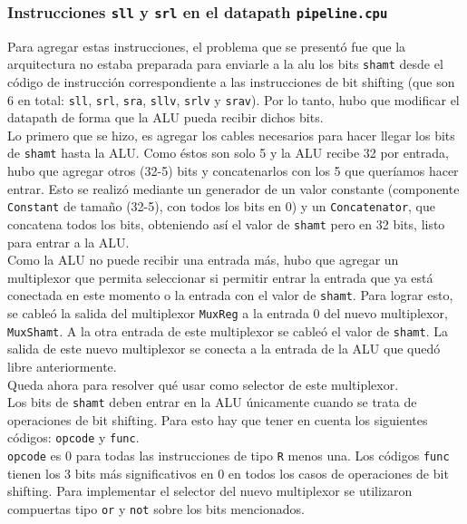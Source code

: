 \documentclass[a4paper,10pt]{article}
\begin{document}
\subsubsection{Instrucciones \texttt{sll} y \texttt{srl} en el datapath \texttt{pipeline.cpu}}
Para agregar estas instrucciones, el problema que se presentó fue que la arquitectura no estaba preparada para enviarle a la alu los bits \texttt{shamt} desde el código de instrucción correspondiente a las instrucciones de bit shifting (que son 6 en total: \texttt{sll}, \texttt{srl}, \texttt{sra}, \texttt{sllv}, \texttt{srlv} y \texttt{srav}). Por lo tanto, hubo que modificar el datapath de forma que la ALU pueda recibir dichos bits. \\
Lo primero que se hizo, es agregar los cables necesarios para hacer llegar los bits de \texttt{shamt} hasta la ALU. Como \'estos son solo 5 y la ALU  recibe 32 por entrada, hubo que agregar otros (32-5) bits y concatenarlos con los 5 que quer\'iamos hacer entrar. Esto se realiz\'o mediante un generador de un valor constante (componente \texttt{Constant} de tamaño (32-5), con todos los bits en 0) y un \texttt{Concatenator}, que concatena todos los bits, obteniendo as\'i el valor de \texttt{shamt} pero en 32 bits, listo para entrar a la ALU. \\
Como la ALU  no puede recibir una entrada m\'as, hubo que agregar un multiplexor que permita seleccionar si permitir entrar la entrada que ya est\'a conectada en este momento o la entrada con el valor de \texttt{shamt}. Para lograr esto, se cable\'o la salida del multiplexor \texttt{MuxReg} a la entrada 0 del nuevo multiplexor, \texttt{MuxShamt}. A la otra entrada de este multiplexor se cable\'o el valor de \texttt{shamt}. La salida de este nuevo multiplexor se conecta a la entrada de la ALU que qued\'o libre anteriormente. \\
Queda ahora para resolver qu\'e usar como selector de este multiplexor.\\
Los bits de \texttt{shamt} deben entrar en la ALU  \'unicamente cuando se trata de operaciones de bit shifting. Para esto hay que tener en cuenta los siguientes códigos: \texttt{opcode} y \texttt{func}. \\
\texttt{opcode} es 0 para todas las instrucciones de tipo \texttt{R} menos una. Los c\'odigos \texttt{func} tienen los 3 bits m\'as significativos en 0 en todos los casos de operaciones de bit shifting. Para implementar el selector del nuevo multiplexor se utilizaron compuertas tipo \texttt{or} y \texttt{not} sobre los bits mencionados. 
\end{document}
